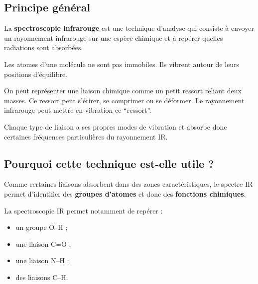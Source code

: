 \documentclass[11pt,a4paper]{article}
\begin{document}
\subsection{Principe général}

\begin{definitionbox}
La \textbf{spectroscopie infrarouge} est une technique d’analyse qui consiste à envoyer un rayonnement infrarouge sur une espèce chimique et à repérer quelles radiations sont absorbées.
\end{definitionbox}

\begin{ideebox}
Les atomes d’une molécule ne sont pas immobiles.  
Ils vibrent autour de leurs positions d’équilibre.
\end{ideebox}

\begin{analogebox}
On peut représenter une liaison chimique comme un petit ressort reliant deux masses.  
Ce ressort peut s’étirer, se comprimer ou se déformer.  
Le rayonnement infrarouge peut mettre en vibration ce ``ressort''.
\end{analogebox}

\begin{comprendrebox}
Chaque type de liaison a ses propres modes de vibration et absorbe donc certaines fréquences particulières du rayonnement IR.
\end{comprendrebox}

\subsection{Pourquoi cette technique est-elle utile ?}

Comme certaines liaisons absorbent dans des zones caractéristiques, le spectre IR permet d’identifier des \textbf{groupes d’atomes} et donc des \textbf{fonctions chimiques}.

\begin{proprietebox}
La spectroscopie IR permet notamment de repérer :
\begin{itemize}
    \item un groupe O--H ;
    \item une liaison C=O ;
    \item une liaison N--H ;
    \item des liaisons C--H.
\end{itemize}
\end{proprietebox}

\end{document}
